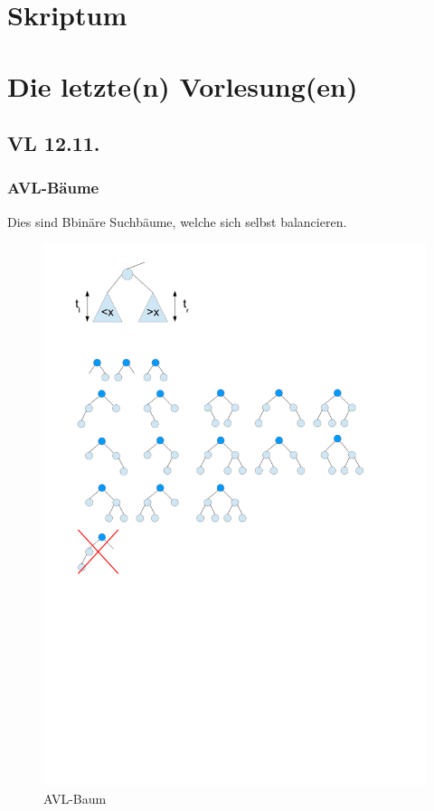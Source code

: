 \documentclass[a4paper,twoside,10pt]{report}
\begin{document}
\part{Skriptum}

\part{Die letzte(n) Vorlesung(en)}
\chapter{VL 12.11.}
\section{AVL-Bäume}
Dies sind Bbinäre Suchbäume, welche sich selbst balancieren.
\begin{figure}[H]\center
\includegraphics[trim= 1cm 25cm 13cm 1cm,clip,width=.7\columnwidth]{figures/avlbase.pdf}
\caption{AVL-Baum}
\end{figure}
\end{document}
